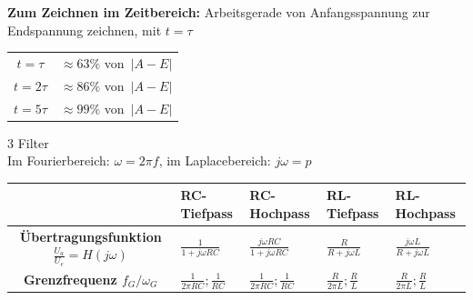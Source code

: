 \documentclass[a5paper, 12pt]{scrartcl}
\begin{document}
\textbf{Zum Zeichnen im Zeitbereich:} Arbeitsgerade von Anfangsspannung zur Endspannung zeichnen, mit \(t = \tau\)


\clearpage

\begin{table}[H]
  \centering
  \begin{tabular}{cc}
    \toprule
    \(t=\tau\) & \(\approx 63\%\) von\ \(|A-E|\)\\
    \(t=2\tau\) & \(\approx 86\%\) von\ \(|A-E|\)\\
    \(t=5\tau\) & \(\approx 99\%\) von\ \(|A-E|\)\\
    \bottomrule
  \end{tabular}
\end{table}
 
{\Large 3 Filter}\\

Im Fourierbereich: \(\omega = 2 \pi f\), im Laplacebereich: \(j\omega = p\)
\begin{center}
  \begin{tabular}{cllll}
    \toprule
    & \textbf{RC-Tiefpass} & \textbf{RC-Hochpass} & \textbf{RL-Tiefpass} & \textbf{RL-Hochpass}\\
    \midrule
    \textbf{Übertragungsfunktion \(\frac{U_a}{U_e} = H(j\omega)\)} & \(\frac{1}{1 + j\omega R C}\) & \(\frac{j\omega RC}{1 + j\omega RC}\) & \(\frac{R}{R + j \omega L}\)& \(\frac{j\omega L}{R + j \omega L}\) \\[1em]
    \textbf{Grenzfrequenz \(f_G / \omega_G\)} & \(\frac{1}{2 \pi R C}; \frac{1}{RC}\) & \(\frac{1}{2 \pi R C}; \frac{1}{RC}\) & \(\frac{R}{2 \pi L}; \frac{R}{L}\) & \(\frac{R}{2 \pi L}; \frac{R}{L}\)\\
    \bottomrule
  \end{tabular}
\end{center}
\end{document}
